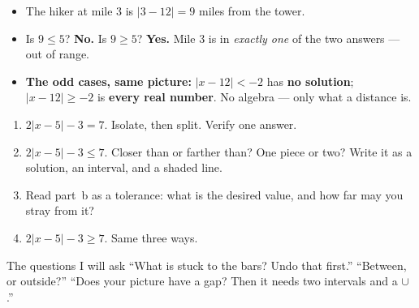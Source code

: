 \documentclass[aspectratio=169, 11pt]{beamer}
\newcommand{\trail}{%
  \draw[->, thick, charcoal] (-0.7,0)--(21.2,0) node[right, font=\tiny]{mile};
  \foreach \x in {0,...,20}{\draw[charcoal] (\x,0.22)--(\x,-0.22);}
  \foreach \x in {0,4,...,20}{\node[below, font=\tiny, charcoal] at (\x,-0.26){$\x$};}
  \fill[forest] (12,0) circle (3pt);
  \node[forest, font=\tiny, above] at (12,0.30){tower};}
\begin{document}
\begin{frame}[t, plain]
  \begin{center}
  \end{center}
  \begin{itemize}\setlength{\itemsep}{5pt}
    \item The hiker at mile 3 is $|3-12| = 9$ miles from the tower.
    \item Is $9 \le 5$? \textbf{No.} \quad Is $9 \ge 5$? \textbf{Yes.} \quad Mile 3 is in
          \emph{exactly one} of the two answers --- out of range.
    \item \textbf{The odd cases, same picture:} $|x-12|<-2$ has \textbf{no solution};
          $|x-12|\ge-2$ is \textbf{every real number}. No algebra --- only what a distance is.
  \end{itemize}
\end{frame}

\begin{frame}[t, plain]
  \begin{enumerate}\setlength{\itemsep}{6pt}
    \item[\textbf{a.}] $2|x-5| - 3 = 7$. Isolate, then split. \; Verify one answer.
    \item[\textbf{b.}] $2|x-5| - 3 \le 7$. Closer than or farther than? One piece or two? Write it
          as a solution, an interval, and a shaded line.
    \item[\textbf{c.}] Read part~b as a tolerance: what is the desired value, and how far may
          you stray from it?
    \item[\textbf{d.}] $2|x-5| - 3 \ge 7$. Same three ways.
  \end{enumerate}
  \vspace{5pt}
  \begin{block}{The questions I will ask}
    ``What is stuck to the bars? Undo that first.'' \quad ``Between, or outside?'' \quad
    ``Does your picture have a gap? Then it needs two intervals and a $\cup$.''
  \end{block}
\end{frame}
\end{document}
